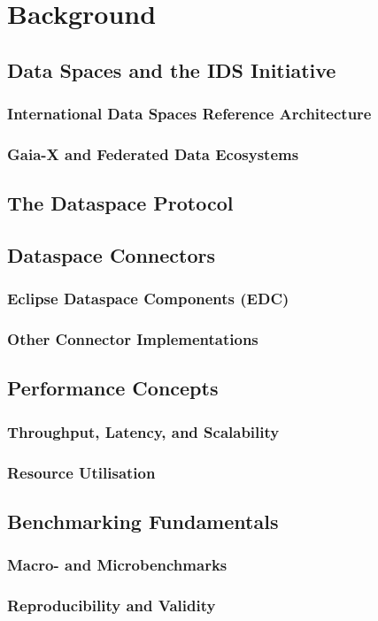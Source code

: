 \chapter{Background}\label{chap:background}

\section{Data Spaces and the IDS Initiative}\label{sec:data-spaces-ids}
\subsection{International Data Spaces Reference Architecture}\label{subsec:ids-ram}
\subsection{Gaia-X and Federated Data Ecosystems}\label{subsec:gaia-x}

\section{The Dataspace Protocol}\label{sec:dsp}

\section{Dataspace Connectors}\label{sec:connectors}
\subsection{Eclipse Dataspace Components (EDC)}\label{subsec:edc}
\subsection{Other Connector Implementations}\label{subsec:other-connectors}

\section{Performance Concepts}\label{sec:performance-concepts}
\subsection{Throughput, Latency, and Scalability}\label{subsec:perf-metrics}
\subsection{Resource Utilisation}\label{subsec:resource-util}

\section{Benchmarking Fundamentals}\label{sec:benchmarking-fundamentals}
\subsection{Macro- and Microbenchmarks}\label{subsec:macro-micro}
\subsection{Reproducibility and Validity}\label{subsec:repro-validity}
